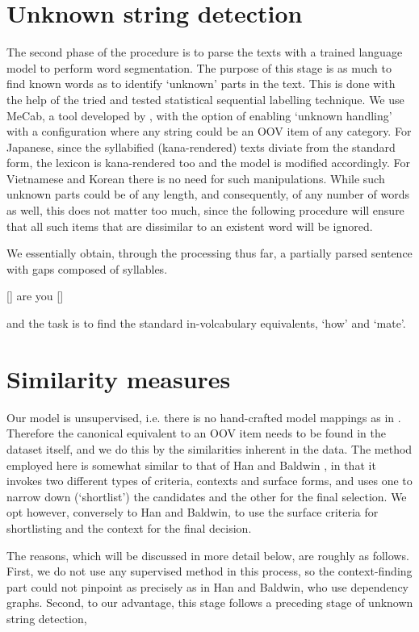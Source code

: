 \documentclass[11pt]{article}
\begin{document}
\section{Unknown string detection}

The second phase of the procedure is to parse the texts with a trained language model to perform word segmentation. The purpose of this stage is as much to find known words as to identify `unknown' parts in the text. This is done with the help of the tried and tested statistical sequential labelling technique. We use MeCab, a tool developed by \cite{KudoEtAl04}, with the option of enabling `unknown handling' with a configuration where any string could be an OOV item of any category. For Japanese, since the syllabified (kana-rendered) texts diviate from the standard form, the lexicon is kana-rendered too and the model is modified accordingly. For Vietnamese and Korean there is no need for such manipulations. While such unknown parts could be of any length, and consequently, of any number of words as well, this does not matter too much, since the following procedure will ensure that all such items that are dissimilar to an existent word will be ignored. 

We essentially obtain, through the processing thus far, a partially parsed sentence with gaps composed of syllables. 

[] are you [\textipa{}]

\noindent and the task is to find the standard in-volcabulary equivalents, `how' and `mate'.

\section{Similarity measures}

Our model is unsupervised, i.e. there is no hand-crafted model mappings as in \cite{SaitoEtAl14}. Therefore the canonical equivalent to an OOV item needs to be found in the dataset itself, and we do this by the similarities inherent in the data. The method employed here is somewhat similar to that of Han and Baldwin \cite{HanBaldwin11}, in that it invokes two different types of criteria, contexts and surface forms, and uses one to narrow down (`shortlist') the candidates and the other for the final selection. We opt however, conversely to Han and Baldwin, to use the surface criteria for shortlisting and the context for the final decision. 

The reasons, which will be discussed in more detail below, are roughly as follows. First, we do not use any supervised method in this process, so the context-finding part could not pinpoint as precisely as in Han and Baldwin, who use dependency graphs. Second, to our advantage, this stage follows a preceding stage of unknown string detection,   
\end{document}
